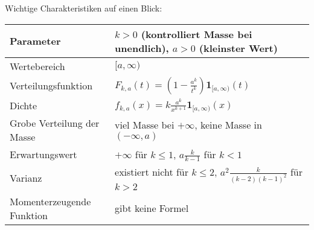 Wichtige Charakteristiken auf einen Blick:
\begin{center}
\begin{tabular}[h]{|l|l|}
\hline
Parameter& $k>0$ (kontrolliert Masse bei unendlich), $a>0$ (kleinster Wert)\\
\hline
Wertebereich & $[a,\infty)$\\
\hline
Verteilungsfunktion & $F_{k,a}(t)=(1-\frac{a^k}{t^k}) \mathbf 1_{[a,\infty)}(t)$\\
\hline
Dichte & $f_{k,a} (x)= k \frac{a^k}{x^{k+1}}\mathbf 1_{[a,\infty)}(x)$\\
\hline
Grobe Verteilung der Masse & viel Masse bei $+\infty$, keine Masse in $(-\infty,a)$\\
\hline
Erwartungswert& $+\infty$ f\"ur $k\leq 1$, $a \frac{k}{k-1}$ f\"ur $k<1$ \\
\hline
Varianz & existiert nicht f\"ur $k\leq 2$, $a^2 \frac{k}{(k-2)(k-1)^2}$ f\"ur $k>2$\\
\hline
Momenterzeugende Funktion& gibt keine Formel\\
\hline
\end{tabular}
\end{center}



